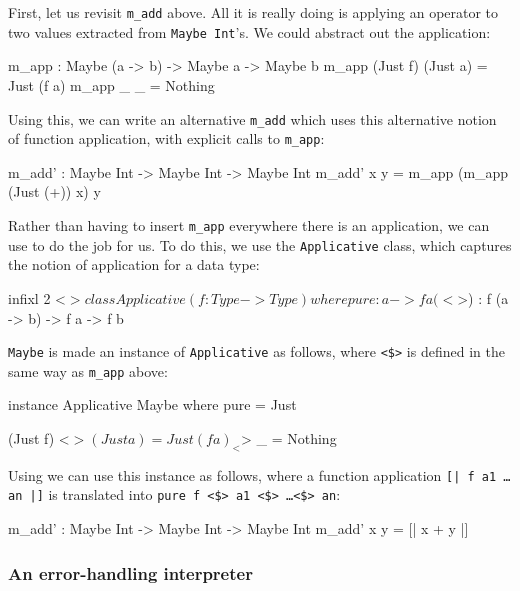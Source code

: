 First, let us revisit \texttt{m\_add} above. All it is really doing is applying an operator to two values extracted from \texttt{Maybe Int}'s.
We could abstract out the application:

\begin{code}
m_app : Maybe (a -> b) -> Maybe a -> Maybe b
m_app (Just f) (Just a) = Just (f a)
m_app _        _        = Nothing
\end{code} 

\noindent
Using this, we can write an alternative \texttt{m\_add} which uses this alternative notion of function application, with explicit calls to \texttt{m\_app}:

\begin{code}
m_add' : Maybe Int -> Maybe Int -> Maybe Int
m_add' x y = m_app (m_app (Just (+)) x) y
\end{code} 

\noindent
Rather than having to insert \texttt{m\_app} everywhere there is an application, we can use  to do the job for us.
To do this, we use the \texttt{Applicative} class, which captures the notion of application for a data type:

\begin{code}
infixl 2 <$> 

class Applicative (f : Type -> Type) where 
    pure  : a -> f a
    (<$>) : f (a -> b) -> f a -> f b 
\end{code} 

\noindent
\texttt{Maybe} is made an instance of \texttt{Applicative} as follows, where \texttt{<\$>} is defined in the same way as \texttt{m\_app} above:

\begin{code}
instance Applicative Maybe where
    pure = Just

    (Just f) <$> (Just a) = Just (f a)
    _        <$> _        = Nothing
\end{code} 

\noindent
Using  we can use this instance as follows, where a function application \texttt{[| f a1 \dots an |]} is translated into \texttt{pure f <\$> a1 <\$> \dots <\$> an}:

\begin{code}
m_add' : Maybe Int -> Maybe Int -> Maybe Int
m_add' x y = [| x + y |]
\end{code} 

\subsubsection{An error-handling interpreter}

